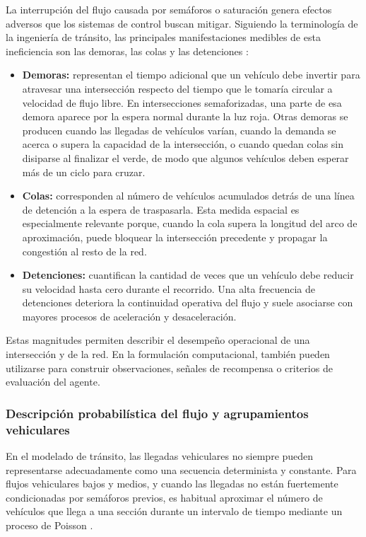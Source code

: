 La interrupción del flujo causada por semáforos o saturación genera efectos adversos que los sistemas de control buscan mitigar. Siguiendo la terminología de la ingeniería de tránsito, las principales manifestaciones medibles de esta ineficiencia son las demoras, las colas y las detenciones \cite{fernandez}:
\begin{itemize}
    \item \textbf{Demoras:} representan el tiempo adicional que un vehículo debe invertir para atravesar una intersección respecto del tiempo que le tomaría circular a velocidad de flujo libre. En intersecciones semaforizadas, una parte de esa demora aparece por la espera normal durante la luz roja. Otras demoras se producen cuando las llegadas de vehículos varían, cuando la demanda se acerca o supera la capacidad de la intersección, o cuando quedan colas sin disiparse al finalizar el verde, de modo que algunos vehículos deben esperar más de un ciclo para cruzar.
    \item \textbf{Colas:} corresponden al número de vehículos acumulados detrás de una línea de detención a la espera de traspasarla. Esta medida espacial es especialmente relevante porque, cuando la cola supera la longitud del arco de aproximación, puede bloquear la intersección precedente y propagar la congestión al resto de la red.
    \item \textbf{Detenciones:} cuantifican la cantidad de veces que un vehículo debe reducir su velocidad hasta cero durante el recorrido. Una alta frecuencia de detenciones deteriora la continuidad operativa del flujo y suele asociarse con mayores procesos de aceleración y desaceleración.
\end{itemize}

Estas magnitudes permiten describir el desempeño operacional de una intersección y de la red. En la formulación computacional, también pueden utilizarse para construir observaciones, señales de recompensa o criterios de evaluación del agente.

\subsubsection{Descripción probabilística del flujo y agrupamientos vehiculares}

En el modelado de tránsito, las llegadas vehiculares no siempre pueden representarse adecuadamente como una secuencia determinista y constante. Para flujos vehiculares bajos y medios, y cuando las llegadas no están fuertemente condicionadas por semáforos previos, es habitual aproximar el número de vehículos que llega a una sección durante un intervalo de tiempo mediante un proceso de Poisson \cite{calymayor}.

